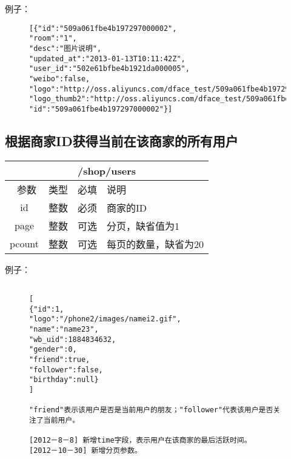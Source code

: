 \documentclass[cs4size]{ctexartutf8}
\begin{document}
例子：

\begin{figure}[H]
\begin{verbatim}
[{"id":"509a061fbe4b197297000002",
"room":"1",
"desc":"图片说明",  
"updated_at":"2013-01-13T10:11:42Z",
"user_id":"502e61bfbe4b1921da000005",
"weibo":false,
"logo":"http://oss.aliyuncs.com/dface_test/509a061fbe4b197297000002/0.jpg",
"logo_thumb2":"http://oss.aliyuncs.com/dface_test/509a061fbe4b197297000002/t2_0.jpg",
"id":"509a061fbe4b197297000002"}]

\end{verbatim}
\end{figure}


\subsection{根据商家ID获得当前在该商家的所有用户}

\begin{table}[H]
   \begin{center}
\begin{tabular}{|c|c|c|p{12cm}|}
\hline
\multicolumn{4}{|c|}{/shop/users} \\
\hline\hline
 \  参数  & 类型 & 必填 &  说明  \\
\hline
 id  & 整数 & 必须 & 商家的ID\\
  \hline
 page  & 整数 & 可选 & 分页，缺省值为1\\ 
 \hline
 pcount  & 整数 & 可选 & 每页的数量，缺省为20\\ 
\hline
\end{tabular}
   \end{center}
\end{table}


例子：

\begin{figure}[H]
\begin{verbatim}

[
{"id":1,
"logo":"/phone2/images/namei2.gif",
"name":"name23",
"wb_uid":1884834632,
"gender":0,
"friend":true,
"follower":false,
"birthday":null}
]

"friend"表示该用户是否是当前用户的朋友；"follower"代表该用户是否关注了当前用户。

[2012－8－8] 新增time字段，表示用户在该商家的最后活跃时间。
[2012－10－30] 新增分页参数。


\end{verbatim}
\end{figure}
\end{document}
